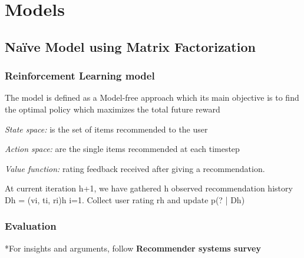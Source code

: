 \chapter{Models}
\label{sec:chapterlabel3}

\section{Na\"{i}ve Model using Matrix Factorization}



\subsection{Reinforcement Learning model}

The model is defined as a Model-free approach which its main objective is to find the optimal policy which maximizes the total future reward

\textit{State space:} is the set of items recommended to the user

\textit{Action space:} are the single items recommended at each timestep

\textit{Value function:} rating feedback received after giving a recommendation.



At current iteration h+1, we have gathered h observed recommendation history Dh = {(vi, ti, ri)}h
i=1.
Collect user rating rh and update p(? | Dh)

\subsection{Evaluation}

*For insights and arguments, follow \textbf{Recommender systems survey}

